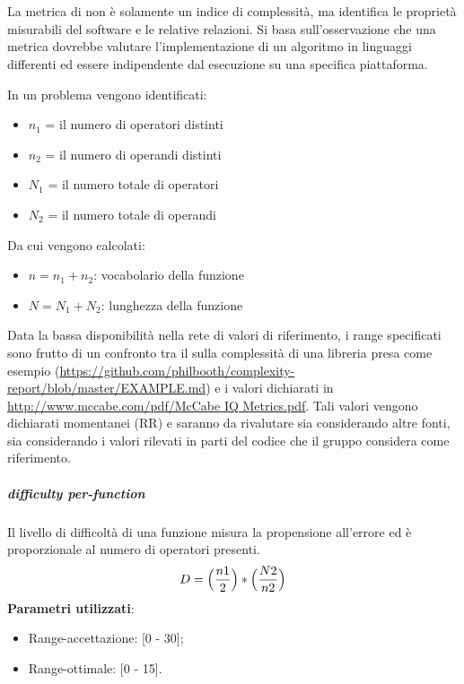 			
			\paragraph{}\mbox{} \\
			
			La metrica di  non è solamente un indice di complessità, ma identifica le proprietà misurabili del software e le relative relazioni. Si basa sull'osservazione che una metrica dovrebbe valutare l'implementazione di un algoritmo in linguaggi differenti ed essere indipendente dal esecuzione su una specifica piattaforma.

			In un problema vengono identificati:
			\begin{itemize}
				\item $n_1$ = il numero di operatori distinti
				\item $n_2$ = il numero di operandi distinti
				\item $N_1$ = il numero totale di operatori
				\item $N_2$ = il numero totale di operandi
			\end{itemize}
			Da cui vengono calcolati:
				\begin{itemize}
				\item $n = n_1 + n_2$: vocabolario della funzione
				\item $N = N_1 + N_2$: lunghezza della funzione
			\end{itemize}
			Data la bassa disponibilità nella rete di valori di riferimento, i range specificati sono frutto di un confronto tra il  sulla complessità di una libreria  presa come esempio (\url{https://github.com/philbooth/complexity-report/blob/master/EXAMPLE.md}) e i valori dichiarati in \url{http://www.mccabe.com/pdf/McCabe IQ Metrics.pdf}. Tali valori vengono dichiarati momentanei (RR) e saranno da rivalutare sia considerando altre fonti, sia considerando i valori rilevati in parti del codice che il gruppo considera come riferimento. %

			
			\subparagraph{ difficulty per-function}
			Il livello di difficoltà di una funzione misura la propensione all'errore ed è proporzionale al numero di operatori presenti. 
			\[
			 D = \Bigl( \frac{n1}{2} \Bigr)  * \Bigl(  \frac{N2}{n2} \Bigr)
			 \]
			\textbf{Parametri utilizzati}:
			\begin{itemize}
				\item Range-accettazione: [0 - 30];
				\item Range-ottimale: [0 - 15].
			\end{itemize}
			
